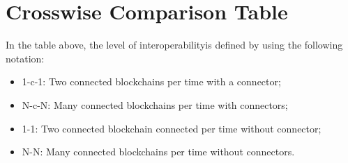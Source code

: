 \section{Crosswise Comparison Table}
 
\noindent In the table above, the level of interoperability\footnotemark[1] is defined by using the following notation:
\begin{itemize}
    \item 1-c-1: Two connected blockchains per time with a connector;
    \item N-c-N: Many connected blockchains per time with connectors;
    \item 1-1: Two connected blockchain connected per time without connector;
    \item N-N: Many connected blockchains per time without connectors.
\end{itemize}







